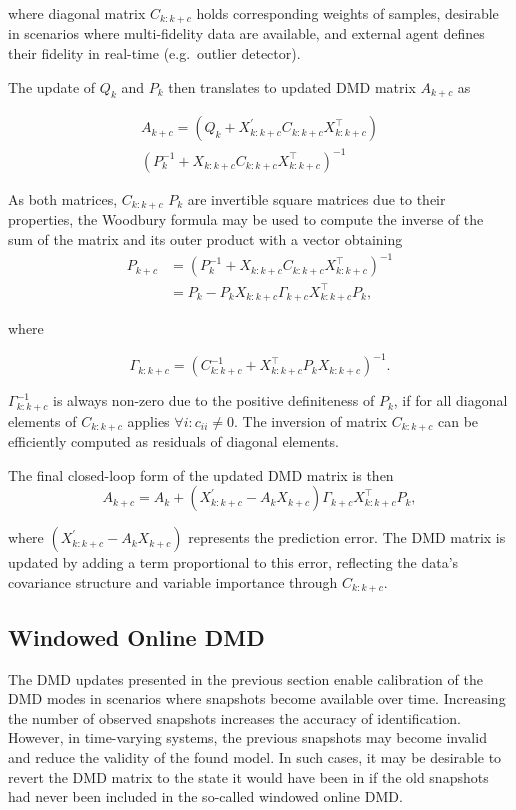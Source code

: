 where diagonal matrix \(C_{k: k + c}\) holds corresponding weights of samples, desirable in scenarios where multi-fidelity data are available, and external agent defines their fidelity in real-time (e.g.~outlier detector).

The update of \(Q_k\) and \(P_k\) then translates to updated DMD matrix \(A_{k+c}\) as

\begin{multline}
    A_{k+c} = (Q_k + X^\prime_{k : k + c} C_{k : k + c} X_{k : k + c}^\top) \\ {(P_k^{-1} + X_{k : k + c} C_{k : k + c} X_{k : k + c}^\top)}^{-1}
\end{multline}

As both matrices, \(C_{k: k + c}\) \(P_k\) are invertible square matrices due to their properties, the Woodbury formula may be used to compute the inverse of the sum of the matrix and its outer product with a vector obtaining
\begin{align}\label{eq:precision-matrix-update}
    P_{k+c} & = {(P_k^{-1} + X_{k : k + c} C_{k : k + c} X_{k : k + c}^\top)}^{-1} \nonumber \\
    & = P_k - P_k X_{k : k + c} \Gamma_{k+c} X_{k : k + c}^\top P_k,
\end{align}

where

\begin{equation}
    \Gamma_{k : k + c} = {(C_{k : k + c}^{-1} + X_{k : k + c}^\top P_k X_{k : k + c})}^{-1}.
\end{equation}

\(\Gamma_{k : k + c}^{-1}\) is always non-zero due to the positive definiteness of \(P_k\), if for all diagonal elements of \(C_{k : k + c}\) applies \( \forall i : c_{ii} \neq 0 \). The inversion of matrix \(C_{k: k + c}\) can be efficiently computed as residuals of diagonal elements.

The final closed-loop form of the updated DMD matrix is then
\begin{equation}\label{eq:online-dmd-update}
    A_{k+c} = A_k + (X^\prime_{k : k+c} - A_k X_{k+c}) \Gamma_{k+c} X_{k : k+c}^\top P_k,
\end{equation}

where \((X^\prime_{k : k+c} - A_k X_{k+c})\) represents the prediction error. The DMD matrix is updated by adding a term proportional to this error, reflecting the data's covariance structure and variable importance through \(C_{k: k + c}\).

\subsection{Windowed Online DMD}
The DMD updates presented in the previous section enable calibration of the DMD modes in scenarios where snapshots become available over time. Increasing the number of observed snapshots increases the accuracy of identification. However, in time-varying systems, the previous snapshots may become invalid and reduce the validity of the found model. In such cases, it may be desirable to revert the DMD matrix to the state it would have been in if the old snapshots had never been included in the so-called windowed online DMD\@.

